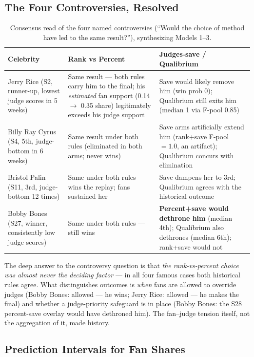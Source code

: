 \documentclass[11pt]{article}
\begin{document}
\subsection{The Four Controversies, Resolved}

\begin{table}[H]
\centering
\caption{Consensus read of the four named controversies (``Would the choice of
method have led to the same result?''), synthesizing Models 1--3.}
\label{tab:consensus}
\small
\begin{tabular}{p{4.1cm}p{4.2cm}p{4.2cm}}
\toprule
Celebrity & Rank vs Percent & Judges-save / Qualibrium \\
\midrule
Jerry Rice (S2, runner-up,
lowest judge scores in 5 weeks) & Same result --- both rules carry him to the
final; his \emph{estimated} fan support (0.14 $\to$ 0.35 share) legitimately
exceeds his judge support & Save would likely remove him (win prob 0);
Qualibrium still exits him (median 1 via F-pool 0.85) \\
\addlinespace
Billy Ray Cyrus (S4, 5th, judge-bottom in 6 weeks) & Same result under both rules
(eliminated in both arms; never wins) & Save arms artificially extend him
(rank+save F-pool $=1.0$, an artifact); Qualibrium concurs with elimination \\
\addlinespace
Bristol Palin (S11, 3rd, judge-bottom 12 times) & Same under both rules --- wins
the replay; fans sustained her & Save dampens her to 3rd; Qualibrium agrees with
the historical outcome \\
\addlinespace
Bobby Bones (S27, winner, consistently low judge scores) & Same under both rules
--- still wins & \textbf{Percent+save would dethrone him} (median 4th);
Qualibrium also dethrones (median 6th); rank+save would not \\
\bottomrule
\end{tabular}
\end{table}

The deep answer to the controversy question is that \emph{the rank-vs-percent
choice was almost never the deciding factor} --- in all four famous cases both
historical rules agree. What distinguishes outcomes is \emph{when} fans are allowed
to override judges (Bobby Bones: allowed --- he wins; Jerry Rice: allowed --- he
makes the final) and whether a judge-priority safeguard is in place (Bobby Bones:
the S28 percent-save overlay would have dethroned him). The fan--judge tension
itself, not the aggregation of it, made history.

\subsection{Prediction Intervals for Fan Shares}
\end{document}
